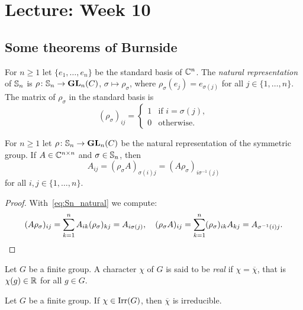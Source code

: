 \section{Lecture: Week 10}

\subsection{Some theorems of Burnside}

For $n\geq1$ let $\{e_1,\dots,e_n\}$ be the standard basis of $\mathbb{C}^n$.  
The \emph{natural representation} of $\mathbb{S}_n$ is 
$\rho\colon\mathbb{S}_n\to\mathbf{GL}_n(C)$, $\sigma\mapsto\rho_{\sigma}$, 
where $\rho_\sigma(e_j)=e_{\sigma(j)}$ for all $j\in\{1,\dots,n\}$. 
The matrix of $\rho_\sigma$ in the standard basis is  
\begin{equation}
    \label{eq:Sn_natural}
    (\rho_\sigma)_{ij}=\begin{cases}
      1 & \text{if $i=\sigma(j)$},\\
      0 & \text{otherwise}.
    \end{cases}
\end{equation}

\begin{lemma}
	\label{lem:permutaciones}
	For $n\geq1$ let $\rho\colon\mathbb{S}_n\to\mathbf{GL}_n(C)$ be the natural 
	representation of the symmetric group. 
	If $A\in\mathbb{C}^{n\times n}$ and $\sigma\in\mathbb{S}_n$, then
	\[
		A_{ij}=(\rho_{\sigma}A)_{\sigma(i)j}=(A\rho_{\sigma})_{i\sigma^{-1}(j)}
	\]
    for all $i,j\in\{1,\dots,n\}$.
\end{lemma}

\begin{proof}
	With~\eqref{eq:Sn_natural} we compute:
	\[
		(A\rho_{\sigma})_{ij}=\sum_{k=1}^n A_{ik}(\rho_{\sigma})_{kj}=A_{i\sigma(j)},
		\quad
		(\rho_\sigma A)_{ij}=\sum_{k=1}^n (\rho_\sigma)_{ik}A_{kj}=A_{\sigma^{-1}(i)j}.\qedhere
	\]
\end{proof}

\begin{definition}
  Let $G$ be a finite group. A character $\chi$ of $G$ is said to be
  \emph{real} if
  $\chi=\overline{\chi}$, that is $\chi(g)\in\mathbb{R}$ for all $g\in G$. 
\end{definition}

\begin{exercise}
	\label{xca:chi_irreducible}
	Let $G$ be a finite group. If $\chi\in\operatorname{Irr}(G)$, then 
	$\overline{\chi}$ is irreducible.
\end{exercise}

